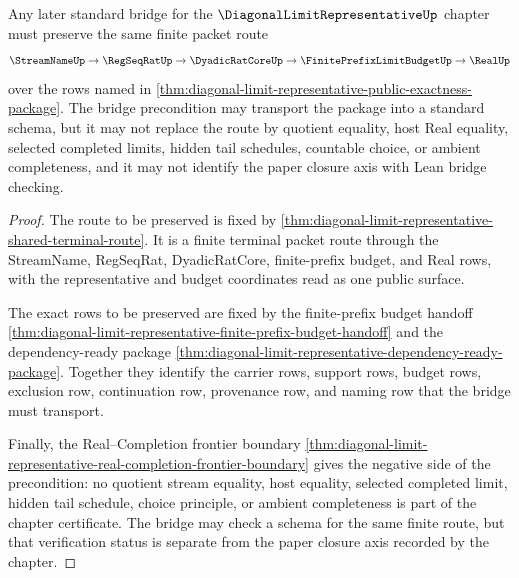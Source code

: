 \begin{theorem}
\label{thm:diagonal-limit-representative-bridge-precondition-package}
Any later standard bridge for the $\DiagonalLimitRepresentativeUp$ chapter must preserve the same finite packet route
$$
\StreamNameUp \to \RegSeqRatUp \to \DyadicRatCoreUp \to \FinitePrefixLimitBudgetUp \to \RealUp
$$
over the rows named in \autoref{thm:diagonal-limit-representative-public-exactness-package}. The bridge precondition may transport the package into a standard schema, but it may not replace the route by quotient equality, host Real equality, selected completed limits, hidden tail schedules, countable choice, or ambient completeness, and it may not identify the paper closure axis with Lean bridge checking.
\end{theorem}
\begin{proof}
The route to be preserved is fixed by \autoref{thm:diagonal-limit-representative-shared-terminal-route}. It is a finite terminal packet route through the StreamName, RegSeqRat, DyadicRatCore, finite-prefix budget, and Real rows, with the representative and budget coordinates read as one public surface.

The exact rows to be preserved are fixed by the finite-prefix budget handoff \autoref{thm:diagonal-limit-representative-finite-prefix-budget-handoff} and the dependency-ready package \autoref{thm:diagonal-limit-representative-dependency-ready-package}. Together they identify the carrier rows, support rows, budget rows, exclusion row, continuation row, provenance row, and naming row that the bridge must transport.

Finally, the Real--Completion frontier boundary \autoref{thm:diagonal-limit-representative-real-completion-frontier-boundary} gives the negative side of the precondition: no quotient stream equality, host equality, selected completed limit, hidden tail schedule, choice principle, or ambient completeness is part of the chapter certificate. The bridge may check a schema for the same finite route, but that verification status is separate from the paper closure axis recorded by the chapter.
\end{proof}
